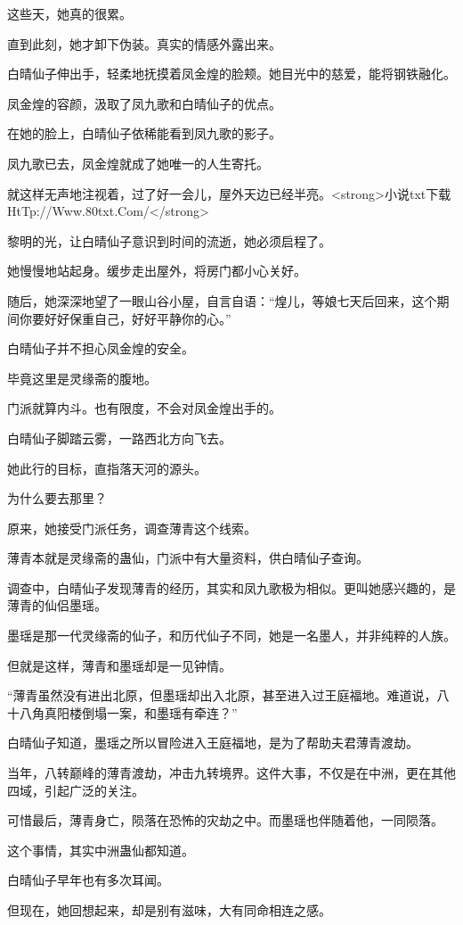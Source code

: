\begin{this_body}
这些天，她真的很累。

直到此刻，她才卸下伪装。真实的情感外露出来。

白晴仙子伸出手，轻柔地抚摸着凤金煌的脸颊。她目光中的慈爱，能将钢铁融化。

凤金煌的容颜，汲取了凤九歌和白晴仙子的优点。

在她的脸上，白晴仙子依稀能看到凤九歌的影子。

凤九歌已去，凤金煌就成了她唯一的人生寄托。

就这样无声地注视着，过了好一会儿，屋外天边已经半亮。<strong>小说txt下载HtTp://Www.80txt.Com/</strong>

黎明的光，让白晴仙子意识到时间的流逝，她必须启程了。

她慢慢地站起身。缓步走出屋外，将房门都小心关好。

随后，她深深地望了一眼山谷小屋，自言自语：“煌儿，等娘七天后回来，这个期间你要好好保重自己，好好平静你的心。”

白晴仙子并不担心凤金煌的安全。

毕竟这里是灵缘斋的腹地。

门派就算内斗。也有限度，不会对凤金煌出手的。

白晴仙子脚踏云雾，一路西北方向飞去。

她此行的目标，直指落天河的源头。

为什么要去那里？

原来，她接受门派任务，调查薄青这个线索。

薄青本就是灵缘斋的蛊仙，门派中有大量资料，供白晴仙子查询。

调查中，白晴仙子发现薄青的经历，其实和凤九歌极为相似。更叫她感兴趣的，是薄青的仙侣墨瑶。

墨瑶是那一代灵缘斋的仙子，和历代仙子不同，她是一名墨人，并非纯粹的人族。

但就是这样，薄青和墨瑶却是一见钟情。

“薄青虽然没有进出北原，但墨瑶却出入北原，甚至进入过王庭福地。难道说，八十八角真阳楼倒塌一案，和墨瑶有牵连？”

白晴仙子知道，墨瑶之所以冒险进入王庭福地，是为了帮助夫君薄青渡劫。

当年，八转巅峰的薄青渡劫，冲击九转境界。这件大事，不仅是在中洲，更在其他四域，引起广泛的关注。

可惜最后，薄青身亡，陨落在恐怖的灾劫之中。而墨瑶也伴随着他，一同陨落。

这个事情，其实中洲蛊仙都知道。

白晴仙子早年也有多次耳闻。

但现在，她回想起来，却是别有滋味，大有同命相连之感。


\end{this_body}
